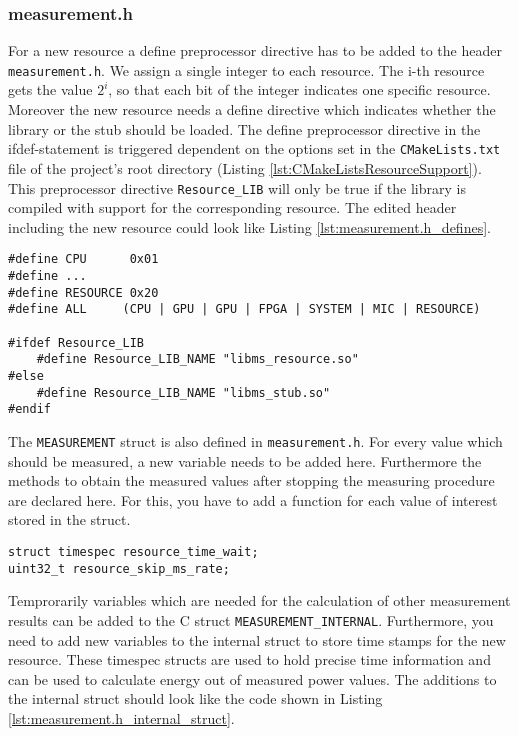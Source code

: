 \subsubsection{measurement.h}
\label{sec:measurement_h}
For a new resource a define preprocessor directive has to be added to the header \texttt{measurement.h}. We assign a single integer to each resource. The i-th resource gets the value $2^{i}$, so that each bit of the integer indicates one specific resource. Moreover the new resource needs a define directive which indicates whether the library or the stub should be loaded. The define preprocessor directive in the ifdef-statement is triggered dependent on the options set in the \texttt{CMakeLists.txt} file of the project's root directory (Listing \ref{lst:CMakeListsResourceSupport}). This preprocessor directive \texttt{Resource\_LIB} will only be true if the library is compiled with support for the corresponding resource. The edited header including the new resource could look like Listing \ref{lst:measurement.h_defines}.
\begin{lstlisting}[caption={Extended \texttt{measurement.h} header file with new define directives to support a new resource.},label=lst:measurement.h_defines]
#define CPU		 0x01
#define ...
#define RESOURCE 0x20
#define ALL		(CPU | GPU | GPU | FPGA | SYSTEM | MIC | RESOURCE)
		
#ifdef Resource_LIB
	#define Resource_LIB_NAME "libms_resource.so"
#else
	#define Resource_LIB_NAME "libms_stub.so"
#endif
\end{lstlisting}
The \texttt{MEASUREMENT} struct is also defined in \texttt{measurement.h}. For every value which should be measured, a new variable needs to be added here. Furthermore the methods to obtain the measured values after stopping the measuring procedure are declared here. For this, you have to add a function for each value of interest stored in the struct. 
\begin{lstlisting}[caption={Mandatory extensions for the \texttt{MEAUSREMENT} struct defined in \texttt{measurement.h}.},label=lst:measurement.h_struct]
struct timespec resource_time_wait;
uint32_t resource_skip_ms_rate;
\end{lstlisting}
Temprorarily variables which are needed for the calculation of other measurement results can be added to the C struct \texttt{MEASUREMENT\_INTERNAL}. Furthermore, you need to add new variables to the internal struct to store time stamps for the new resource. These timespec structs are used to hold precise time information and can be used to calculate energy out of measured power values. The additions to the internal struct should look like the code shown in Listing \ref{lst:measurement.h_internal_struct}.
